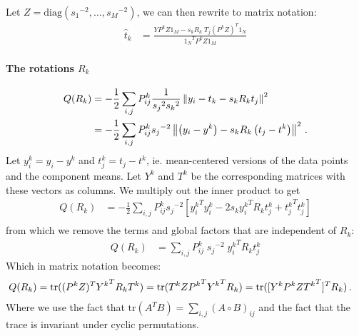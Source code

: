\documentclass[10pt,a4paper,oneside]{article}
\theoremstyle{definition}
\newcommand{\p}{\mbox{\,.}}
\theoremstyle{definition}
\begin{document}
Let $Z = \text{diag}({s_1}^{-2}, \ldots, {s_M}^{-2})$, we can then rewrite to matrix notation:
\begin{align*}
\hat t_k &= \frac{YP^kZ1_M - s_kR_k\;T_j(P^kZ)^T1_N}{{1_N}^TP^kZ1_M} 
\end{align*} 

\paragraph{The rotations $R_k$}
\begin{align*} 
Q(R_k) &= - \frac{1}{2}\sum_{i,j} P^k_{ij} \frac{1}{{s_j}^2{s_k}^2} \left\| y_i - t_k - s_kR_k t_j \right\|^2\\
&= - \frac{1}{2}\sum_{i,j} P^k_{ij} {s_j}^{-2} \left\| \left(y_i - y^k\right) - s_kR_k \left(t_j-t^k\right) \right\|^2 \p 
\end{align*}
Let ${y^k_i} = y_i - y^k$ and ${t^k_j} = t_j - t^k$, ie. mean-centered versions of the data points and the component means. Let $Y^k$ and ${T^k}$ be the corresponding matrices with these vectors as columns. We multiply out the inner product to get
\begin{align*}
Q(R_k) &= - \frac{1}{2}\sum_{i,j} P^k_{ij} {s_j}^{-2} \left[ {y_i^k}^T{y_i^k} - 2 s_k {y_i^k}^TR_k{t_j^k} + {t_j^k}^T{t_j^k} \right] \\
\end{align*}
from which we remove the terms and global factors that are independent of $R_k$:
\begin{align*}
Q(R_k)&= \sum_{i,j} P^k_{ij}\; {s_j}^{-2}\; {y_i^k}^TR_k{t_j^k}
\end{align*}
Which in matrix notation becomes:
\begin{align*} 
Q(R_k) &= \text{tr}((P^k Z)^T {Y^k}^TR_kT^k) = \text{tr}(T^k Z {P^k}^T{Y^k}^TR_k) = \text{tr}([Y^kP^kZ{T^k}^T]^TR_k) \p
\end{align*}
Where we use the fact that $\text{tr}(A^TB) = \sum_{i,j}(A\circ B)_{ij}$ and the fact that the trace is invariant under cyclic permutations.
\end{document}
